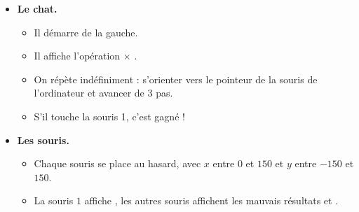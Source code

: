 \documentclass[class=report,crop=false, 12pt]{standalone}
\begin{document}
\begin{activite}
\begin{itemize}
\begin{itemize}
  \end{itemize}

\bigskip

  \item \textbf{Le chat.}  
  \begin{itemize}
    \item Il démarre de la gauche.
    \item Il affiche l'opération \og {} $\times$   \fg{}.
    \item On répète indéfiniment : s'orienter vers le pointeur de la souris de l'ordinateur et avancer de $3$ pas.
    \item S'il touche la souris 1, c'est gagné !
  \end{itemize}

\bigskip

  \item \textbf{Les souris.}  
  \begin{itemize}
    \item Chaque souris se place au hasard, avec $x$ entre $0$ et $150$ et 
    $y$ entre $-150$ et $150$.
    \item La souris $1$ affiche , les autres souris affichent
    les mauvais résultats  et .
  \end{itemize}  
\end{itemize}    
   
\end{activite}
\end{document}
